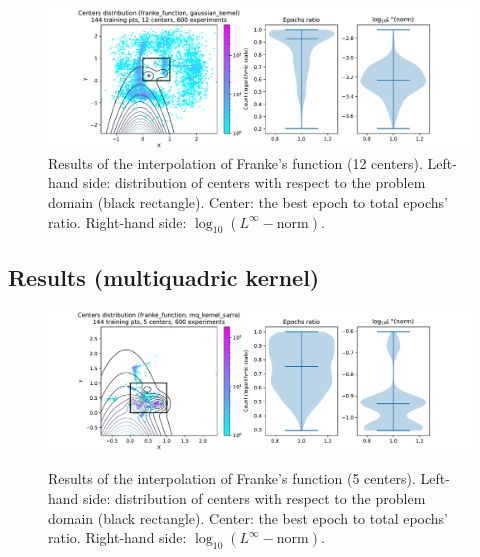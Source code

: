 \documentclass[12pt]{report} %
\begin{document}
\begin{figure}[H]
  \includegraphics[width=\textwidth, trim={2cm 0 2.8cm 0}, clip=true]{imagenes/experiments/2d/franke_interpolation/tr12_c12_franke_function_gaussian_kernel.pdf}
  \caption{Results of the interpolation of Franke's function (12 centers).
    Left-hand side: distribution of centers with respect to the problem domain (black rectangle). Center: the best epoch to total epochs' ratio.
    Right-hand side: $\log_{10}(L^\infty-\text{norm})$.}
  \label{fig:franke-tr12-c12}
\end{figure}

\subsection*{Results (multiquadric kernel)}

\begin{figure}[H]
  {\includegraphics[width=\textwidth, trim={2cm 0 2.8cm 0}, clip=true]{imagenes/experiments/2d/franke_interpolation/tr12_c5_franke_function_mq_kernel_sarra.pdf}}
  \caption{Results of the interpolation of Franke's function (5 centers).
    Left-hand side: distribution of centers with respect to the problem domain (black rectangle). Center: the best epoch to total epochs' ratio.
    Right-hand side: $\log_{10}(L^\infty-\text{norm})$.}
  \label{fig:franke-tr12-c5-mq}
\end{figure}
\end{document}
